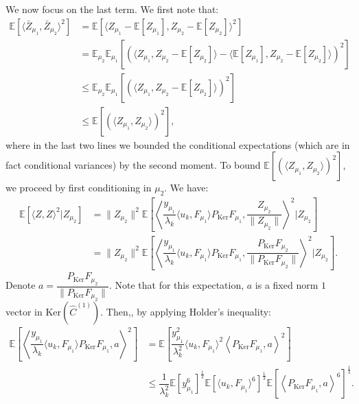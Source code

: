 \documentclass[]{article}
\numberwithin{equation}{section}
\theoremstyle{definition}
\newcommand{\EE}{\mathbb{E}}
\begin{document}
We now focus on the last term. We first note that: 
\begin{align}
    \EE\left [ \langle \bar{Z}_{\mu_1}, \bar{Z}_{\mu_2} \rangle^{2}\right ] &= \EE\left [ \langle Z_{\mu_1} - \EE[Z_{\mu_1}], Z_{\mu_2} - \EE[Z_{\mu_2}]\rangle^{2}\right ]  \\
    & =\EE_{\mu_2} \EE _{\mu_1}\left [ \left ( \langle Z_{\mu_1} , Z_{\mu_2} - \EE[Z_{\mu_2}]\rangle -  \langle \EE[Z_{\mu_1}], Z_{\mu_2} - \EE[Z_{\mu_2}] \rangle \right )^{2}\right ] \\
    & \leq  \EE_{\mu_2} \EE _{\mu_1}\left [ \left ( \langle Z_{\mu_1} , Z_{\mu_2} - \EE[Z_{\mu_2}]\rangle\right )^{2}\right ] \\
    & \leq \EE\left [ \left ( \langle Z_{\mu_1} , Z_{\mu_2} \rangle\right )^{2}\right ],
\end{align}
where in the last two lines we bounded the conditional expectations (which are in fact conditional variances) by the second moment. To bound $\EE\left [ \left ( \langle Z_{\mu_1} , Z_{\mu_2} \rangle\right )^{2}\right ]$, we proceed by first conditioning in $\mu_2$. We have: 
\begin{align}
    \EE\left [ \langle Z, Z \rangle^{2} |Z_{\mu_2}\right ] & =   \| Z_{\mu_2}\|^2 \EE \left [\left \langle \dfrac{y_{\mu_1}}{\lambda_{k}} \langle u_{k}, F_{\mu_1} \rangle P_{\mathrm{Ker}} F_{\mu_1}, \dfrac{Z_{\mu_2}}{ \|Z_{\mu_2}\|} \right \rangle^2 | Z_{\mu_{2}}\right ] \\
    & = \| Z_{\mu_2}\|^2 \EE \left [\left \langle \dfrac{y_{\mu_1}}{\lambda_{k}} \langle u_{k}, F_{\mu_1} \rangle P_{\mathrm{Ker}} F_{\mu_1}, \dfrac{P_{\mathrm{Ker}} F_{\mu_2}}{ \|P_{\mathrm{Ker}} F_{\mu_2}\|} \right \rangle^2 | Z_{\mu_{2}}\right ].
    \label{eq:mid_step_cross_expectaiton_PZ}
\end{align}
Denote $a = \dfrac{P_{\mathrm{Ker}} F_{\mu_2}}{ \| P_{\mathrm{Ker}} F_{\mu_2}\|}$. Note that for this expectation, $a$ is a fixed norm $1$ vector in $\mathrm{Ker}(\hat{C}^{(1)})$. Then,, by applying Holder's inequality: 
\begin{align}
    \EE \left [\left \langle \dfrac{y_{\mu_1}}{\lambda_{k}} \langle u_{k}, F_{\mu_1} \rangle P_{\mathrm{Ker}} F_{\mu_1}, a\right \rangle^2\right ] & =  \EE \left [\dfrac{y_{\mu_1}^2}{\lambda_{k}^2} \langle u_{k}, F_{\mu_1} \rangle^2 \left \langle P_{\mathrm{Ker}} F_{\mu_1}, a\right \rangle^2\right ] \\
    & \leq \dfrac{1}{\lambda_k^2} \EE[y_{\mu_1}^{6}]^{\frac{1}{3}} \EE \left [ \langle u_{k}, F_{\mu_1} \rangle^6\right ]^{\frac{1}{3}}\EE \left [ \left \langle P_{\mathrm{Ker}} F_{\mu_1}, a\right \rangle^6 \right ]^{\frac{1}{3}}. 
\end{align}
\end{document}
